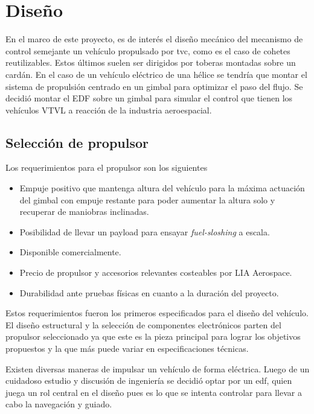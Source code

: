 \section{Diseño}

En el marco de este proyecto, es de interés el diseño mecánico del mecanismo de control semejante un vehículo propulsado por \gls{tvc}, como es el caso de cohetes reutilizables. Estos últimos suelen ser dirigidos por toberas montadas sobre un cardán. En el caso de un vehículo eléctrico de una hélice se tendría que montar el sistema de propulsión centrado en un gimbal para optimizar el paso del flujo. Se decidió montar el EDF sobre un gimbal para simular el control que tienen los vehículos VTVL a reacción de la industria aeroespacial. 



\subsection{Selección de propulsor}

Los requerimientos para el propulsor son los siguientes

\begin{itemize}
    \item Empuje positivo que mantenga altura del vehículo para la máxima actuación del gimbal con empuje restante para poder aumentar la altura solo y recuperar de maniobras inclinadas. 
    \item Posibilidad de llevar un payload para ensayar \textit{fuel-sloshing} a escala.
    \item Disponible comercialmente.
    \item Precio de propulsor y accesorios relevantes costeables por LIA Aerospace.
    \item Durabilidad ante pruebas físicas en cuanto a la duración del proyecto.
\end{itemize}

Estos requerimientos fueron los primeros especificados para el diseño del vehículo. El diseño estructural y la selección de componentes electrónicos parten del propulsor seleccionado ya que este es la pieza principal para lograr los objetivos propuestos y la que más puede variar en especificaciones técnicas.

\medskip 

Existen diversas maneras de impulsar un vehículo de forma eléctrica. Luego de un cuidadoso estudio y discusión de ingeniería se decidió optar por un \gls{edf}, quien juega un rol central en el diseño pues es lo que se intenta controlar para llevar a cabo la navegación y guiado.


